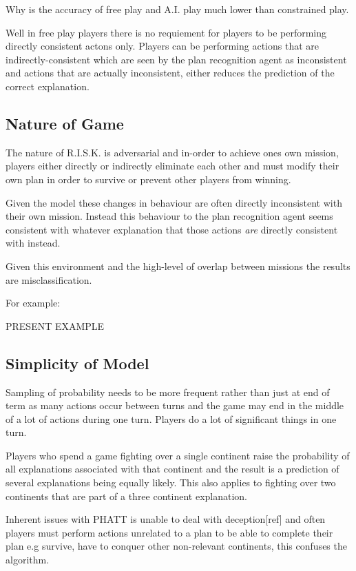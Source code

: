 \documentclass[parskip]{cs4rep}
\begin{document}
Why is the accuracy of free play and A.I. play much lower than constrained play.

Well in free play players there is no requiement for players to be performing directly consistent actons only. Players can be performing actions that are indirectly-consistent which are seen by the plan recognition agent as inconsistent and actions that are actually inconsistent, either reduces the prediction of the correct explanation.

\subsection{Nature of Game}

The nature of R.I.S.K. is adversarial and in-order to achieve ones own mission, players either directly or indirectly eliminate each other and must modify their own plan in order to survive or prevent other players from winning. 

Given the model these changes in behaviour are often directly inconsistent with their own mission. Instead this behaviour to the plan recognition agent seems consistent with whatever explanation that those actions \textit{are} directly consistent with instead.

Given this environment and the high-level of overlap between missions the results are misclassification.

For example:

PRESENT EXAMPLE

\subsection{Simplicity of Model}

Sampling of probability needs to be more frequent rather than just at end of term as many actions occur between turns and the game may end in the middle of a lot of actions during one turn. Players do a lot of significant things in one turn.

Players who spend a game fighting over a single continent raise the probability of all explanations associated with that continent and the result is a prediction of several explanations being equally likely. This also applies to fighting over two continents that are part of a three continent explanation.

Inherent issues with PHATT is unable to deal with deception[ref] and often players must perform actions unrelated to a plan to be able to complete their plan e.g survive, have to conquer other non-relevant continents, this confuses the algorithm.
\end{document}
